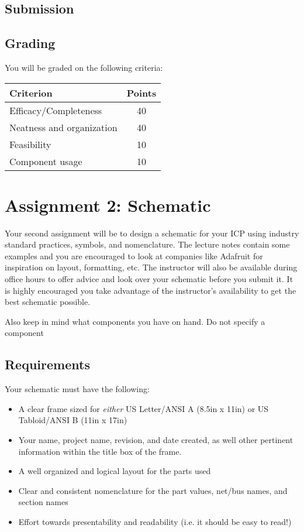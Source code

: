    \subsection*{Submission}
    

    \subsection*{Grading}
    You will be graded on the following criteria:

    \begin{table}[h!]
        \begin{tabular}{l | c}
            \toprule
            Criterion & Points \\

            \midrule
            Efficacy/Completeness & 40 \\
            Neatness and organization & 40 \\
            Feasibility & 10 \\
            Component usage & 10 \\
            \bottomrule
        \end{tabular}
    \end{table}

\section*{Assignment 2: Schematic}
Your second assignment will be to design a schematic for your ICP using industry standard practices, symbols, and nomenclature.
The lecture notes contain some examples and you are encouraged to look at companies like Adafruit for inspiration on layout, formatting, etc.
The instructor will also be available during office hours to offer advice and look over your schematic before you submit it.
It is highly encouraged you take advantage of the instructor's availability to get the best schematic possible.

Also keep in mind what components you have on hand.
Do not specify a component 

    \subsection*{Requirements}
    Your schematic must have the following:
    \begin{itemize}
        \item A clear frame sized for \emph{either} US Letter/ANSI A (8.5in x 11in) or US Tabloid/ANSI B (11in x 17in)
        \item Your name, project name, revision, and date created, as well other pertinent information within the title box of the frame.
        \item A well organized and logical layout for the parts used
        \item Clear and consistent nomenclature for the part values, net/bus names, and section names
        \item Effort towards presentability and readability (i.e. it should be easy to read!)
    \end{itemize}

